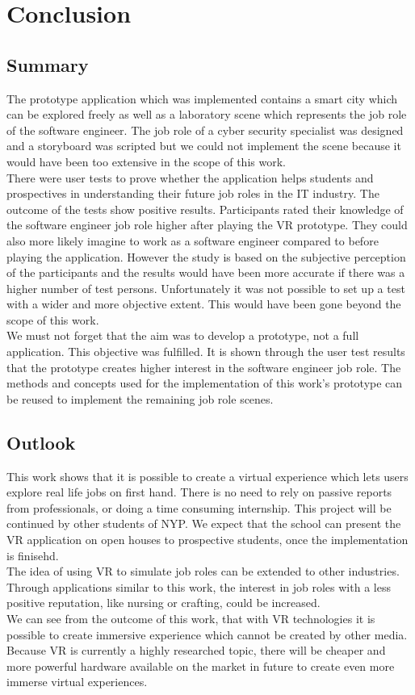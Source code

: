 \chapter{Conclusion} \label{conclusion}
\section{Summary}
The prototype application which was implemented contains a smart city which can be explored freely as well as a laboratory scene which represents the job role of the software engineer. The job role of a cyber security specialist was designed and a storyboard was scripted but we could not implement the scene because it would have been too extensive in the scope of this work. \\
There were user tests to prove whether the application helps students and prospectives in understanding their future job roles in the IT industry. The outcome of the tests show positive results. Participants rated their knowledge of the software engineer job role higher after playing the VR prototype. They could also more likely imagine to work as a software engineer compared to before playing the application. However the study is based on the subjective perception of the participants and the results would have been more accurate if there was a higher number of test persons. Unfortunately it was not possible to set up a test with a wider and more objective extent. This would have been gone beyond the scope of this work.\\
We must not forget that the aim was to develop a prototype, not a full application. This objective was fulfilled. It is shown through the user test results that the prototype creates higher interest in the software engineer job role. The methods and concepts used for the implementation of this work's prototype can be reused to implement the remaining job role scenes.

\section{Outlook}
This work shows that it is possible to create a virtual experience which lets users explore real life jobs on first hand. There is no need to rely on passive reports from professionals, or doing a time consuming internship. This project will be continued by other students of NYP. We expect that the school can present the VR application on open houses to prospective students, once the implementation is finisehd. \\The idea of using VR to simulate job roles can be extended to other industries. Through applications similar to this work, the interest in job roles with a less positive reputation,  like nursing or crafting, could be increased.\\
We can see from the outcome of this work, that with VR technologies it is possible to create immersive experience which cannot be created by other media. Because VR is currently a highly researched topic, there will be cheaper and more powerful hardware available on the market in future to create even more immerse virtual experiences.
